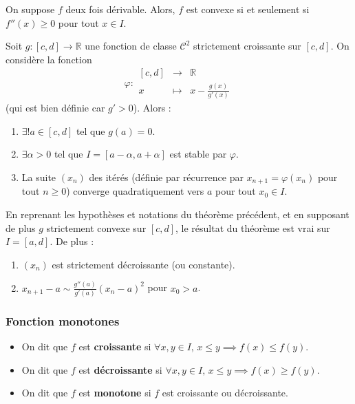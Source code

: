 	\begin{proposition}
		On suppose $f$ deux fois dérivable. Alors, $f$ est convexe si et seulement si $f''(x) \geq 0$ pour tout $x \in I$.
	\end{proposition}


	\begin{application}
		Soit $g : [c, d] \rightarrow \mathbb{R}$ une fonction de classe $\mathcal{C}^2$ strictement croissante sur $[c, d]$. On considère la fonction
		\[ \varphi :
		\begin{array}{ccc}
			[c, d] &\rightarrow& \mathbb{R} \\
			x &\mapsto& x - \frac{g(x)}{g'(x)}
		\end{array}
		\]
		(qui est bien définie car $g' > 0$). Alors :
		\begin{enumerate}[label=(\roman*)]
			\item $\exists! a \in [c, d]$ tel que $g(a) = 0$.
			\item $\exists \alpha > 0$ tel que $I = [a - \alpha, a + \alpha]$ est stable par $\varphi$.
			\item La suite $(x_n)$ des itérés (définie par récurrence par $x_{n+1} = \varphi(x_n)$ pour tout $n \geq 0$) converge quadratiquement vers $a$ pour tout $x_0 \in I$.
		\end{enumerate}
	\end{application}

	\begin{corollary}
		En reprenant les hypothèses et notations du théorème précédent, et en supposant de plus $g$ strictement convexe sur $[c, d]$, le résultat du théorème est vrai sur $I = [a, d]$. De plus :
		\begin{enumerate}[label=(\roman*)]
			\item $(x_n)$ est strictement décroissante (ou constante).
			\item $x_{n+1} - a \sim \frac{g''(a)}{g'(a)} (x_n - a)^2$ pour $x_0 > a$.
		\end{enumerate}
	\end{corollary}

	\newpage
	\subsubsection{Fonction monotones}


	\begin{definition}
		\begin{itemize}
			\item On dit que $f$ est \textbf{croissante} si $\forall x, y \in I, \, x \leq y \implies f(x) \leq f(y)$.
			\item On dit que $f$ est \textbf{décroissante} si $\forall x, y \in I, \, x \leq y \implies f(x) \geq f(y)$.
			\item On dit que $f$ est \textbf{monotone} si $f$ est croissante ou décroissante.
		\end{itemize}
	\end{definition}

